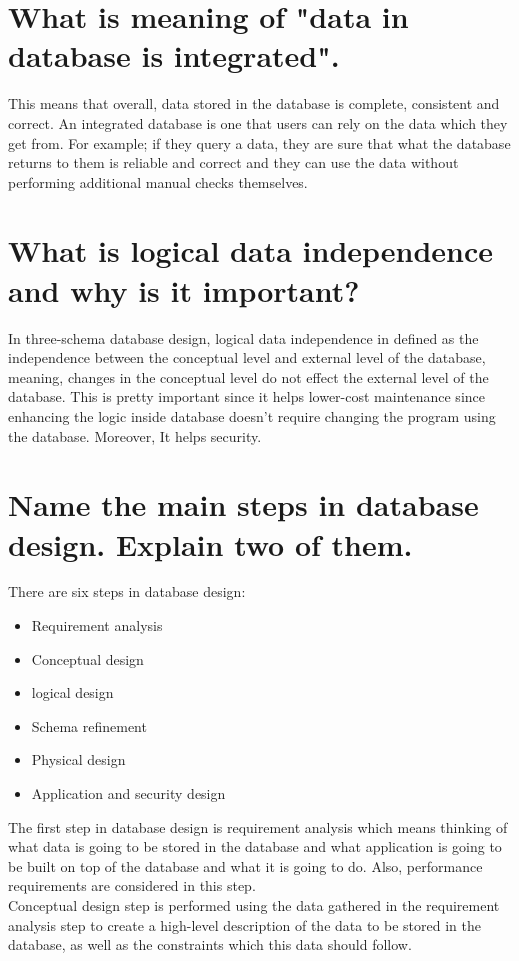 \documentclass[twocolumn,a4paper, 10pt]{article}
\begin{document}
    \section{What is meaning of "data in database is integrated".}

        This means that overall, data stored in the database is complete, consistent and correct. An integrated database is one 
        that users can rely on the data which they get from. For example; if they query a data, they are sure that what the 
        database returns to them is reliable and correct and they can use the data without performing additional manual checks themselves. \\ 
    \section{What is logical data independence and why is it important?}
    
        In three-schema database design, logical data independence in defined as the independence between the conceptual level and 
        external level of the database, meaning, changes in the conceptual level do not effect the external level of the database.
        This is pretty important since it helps lower-cost maintenance since enhancing the logic inside database doesn't require 
        changing the program using the database. Moreover, It helps security. \\
    \section{Name the main steps in database design. Explain two of them.}

        There are six steps in database design:
        \begin{itemize}
            \item Requirement analysis 
            \item Conceptual design
            \item logical design 
            \item Schema refinement 
            \item Physical design 
            \item Application and security design
        \end{itemize}

        The first step in database design is requirement analysis which means thinking of what data is going to be stored in 
        the database and what application is going to be built on top of the database and what it is going to do.
        Also, performance requirements are considered in this step. \\ 
        Conceptual design step is performed using the data gathered in the requirement analysis step to create a high-level 
        description of the data to be stored in the database, as well as the constraints which this data should follow. \\
        
\end{document}
